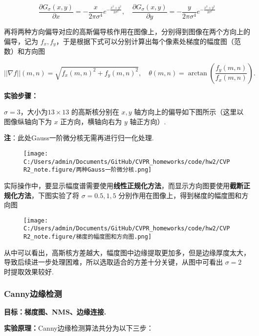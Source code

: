\documentclass[
]{article}
\begin{document}
\[\frac{\partial G_{\sigma}(x, y)}{\partial x}=-\frac{x}{2\pi \sigma^4}e^{-\frac{x^2+y^2}{2\sigma^2}},\quad \frac{\partial G_{\sigma}(x, y)}{\partial y}=-\frac{y}{2\pi \sigma^4}e^{-\frac{x^2+y^2}{2\sigma^2}}\]

再将两种方向偏导对应的高斯偏导核作用在图像上，分别得到图像在两个方向上的偏导，记为
\(f_x, f_y\)，于是根据下式可以分别计算出每个像素处梯度的幅度图（范数）和方向图

\[||\nabla f||(m,n) = \sqrt{f_x(m,n)^2+f_y(m,n)^2},\quad \theta(m,n) = \arctan\left(\frac{f_y(m,n)}{f_x(m,n)}\right).\]

\textbf{实验步骤：}

\(\sigma = 3\)，大小为\(13\times 13\) 的高斯核分别在 \(x,y\)
轴方向上的偏导如下图所示（这里以图像纵轴向下为 \(x\) 正方向，横轴向右为
\(y\) 轴正方向）.

\textbf{注}：此处Gauss一阶微分核无需再进行归一化处理.

\begin{figure}
\centering
\texttt{[image: C:/Users/admin/Documents/GitHub/CVPR\_homeworks/code/hw2/CVPR2\_note.figure/两种Gauss一阶微分核.png]}
\caption{}
\end{figure}

实际操作中，要显示幅度谱需要使用\textbf{线性正规化方法}，而显示方向图要使用\textbf{截断正规化方法}，下图实验了将
\(\sigma=0.5, 1, 5\) 分别作用在图像上，得到梯度的幅度图和方向图

\begin{figure}
\centering
\texttt{[image: C:/Users/admin/Documents/GitHub/CVPR\_homeworks/code/hw2/CVPR2\_note.figure/梯度的幅度图和方向图.png]}
\caption{}
\end{figure}

从中可以看出，高斯核方差越大，幅度图中边缘提取更加多，但是边缘厚度太大，导致后续进一步处理困难，所以选取适合的方差十分关键，从图中可看出
\(\sigma=2\) 时提取效果较好.

\hypertarget{cannyux8fb9ux7f18ux68c0ux6d4b}{%
\subsubsection{Canny边缘检测}\label{cannyux8fb9ux7f18ux68c0ux6d4b}}

\textbf{目标：梯度图、NMS、边缘连接.}

\textbf{实验原理：}Canny边缘检测算法共分为以下三步：
\end{document}
